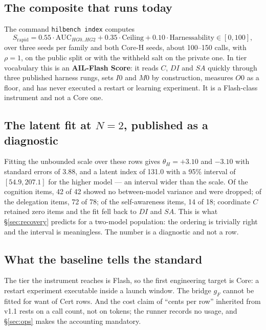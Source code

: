 \documentclass[11pt]{article}
\theoremstyle{definition}
\begin{document}
\subsection{The composite that runs today}
The command \texttt{hilbench index} computes
\[
S_{\mathrm{rapid}} = 0.55\cdot\mathrm{AUC}_{HG0..HG2} + 0.35\cdot\mathrm{Ceiling} + 0.10\cdot\mathrm{Harnessability} \in [0, 100],
\]
over three seeds per family and both Core-H seeds, about 100--150 calls, with $\rho = 1$, on the public split or with the withheld salt on the private one. In tier vocabulary this is an \textbf{AIL-Flash Score}: it reads $C$, $DI$ and $SA$ quickly through three published harness rungs, sets $I0$ and $M0$ by construction, measures $O0$ as a floor, and has never executed a restart or learning experiment. It is a Flash-class instrument and not a Core one.

\begin{table}[!htbp]\centering\footnotesize

\caption{Every row the instrument has produced, as Flash-class evidence. All were run by the instrument's author, who built neither model; under \S\ref{sec:corecert} none is certified. The smaller model bluffs three times bare and gains 8.8 points from a harness that catches part of it; the larger bluffs nowhere on the public split and gains nothing there. That a harness helps the model that fails catchably is the first prediction of \S\ref{sec:predictions}, on two rows. By rule 7 the three rows are one band.}
\label{tab:baseline}
\end{table}

\subsection{The latent fit at $N = 2$, published as a diagnostic}
Fitting the unbounded scale over these rows gives $\theta_H = +3.10$ and $-3.10$ with standard errors of 3.88, and a latent index of 131.0 with a 95\% interval of $[54.9, 207.1]$ for the higher model --- an interval wider than the scale. Of the cognition items, 42 of 42 showed no between-model variance and were dropped; of the delegation items, 72 of 78; of the self-awareness items, 14 of 18; coordinate $C$ retained zero items and the fit fell back to $DI$ and $SA$. This is what \S\ref{sec:recovery} predicts for a two-model population: the ordering is trivially right and the interval is meaningless. The number is a diagnostic and not a row.

\subsection{What the baseline tells the standard}
The tier the instrument reaches is Flash, so the first engineering target is Core: a restart experiment executable inside a launch window. The bridge $g_F$ cannot be fitted for want of Cert rows. And the cost claim of ``cents per row'' inherited from v1.1 rests on a call count, not on tokens; the runner records no usage, and \S\ref{sec:ops} makes the accounting mandatory.
\end{document}
